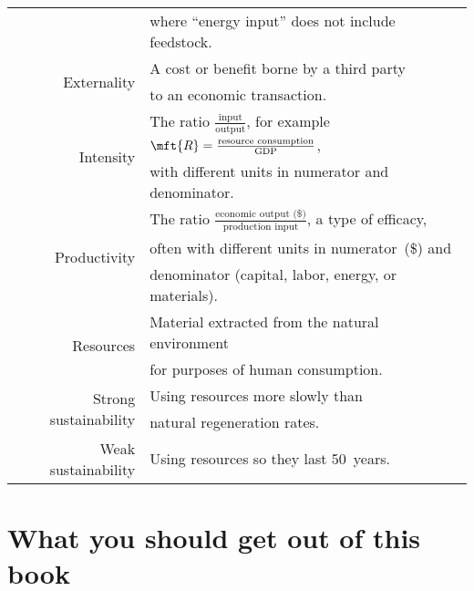 {\begin{table}[h!]
\begin{tabular}{r l}
                      & where ``energy input'' does not include feedstock. \vspace{4mm} \\
%
\multirow{2}{*}{Externality}   & A cost or benefit borne by a third party \\ 
                               & to an economic transaction. \vspace{4mm} \\
%
\multirow{2}{*}{Intensity}  & The ratio $\frac{\text{input}}{\text{output}}$, for example
                              $\mft{R} = \frac{\text{resource consumption}}{\text{GDP}}$, \\
                            & with different units in numerator and denominator. \vspace{4mm} \\
%
\multirow{3}{*}{Productivity} & The ratio $\frac{\text{economic output (\$)}}{\text{production input}}$, a type of efficacy, \\
                              & often with different units in numerator~(\$) and  \\
                              & denominator (capital, labor, energy, or materials). \vspace{4mm} \\
%
\multirow{2}{*}{Resources}  & Material extracted from the natural environment \\
                            & for purposes of human consumption. \vspace{4mm} \\
%
\multirow{2}{*}{Strong sustainability} & Using resources more slowly than \\
                                       & natural regeneration rates. \vspace{4mm} \\
%
Weak sustainability         & Using resources so they last 50~years. \\
\bottomrule
\end{tabular}
\label{tab:key_terms}
\end{table}



\section*{What you should get out of this book} 

}
